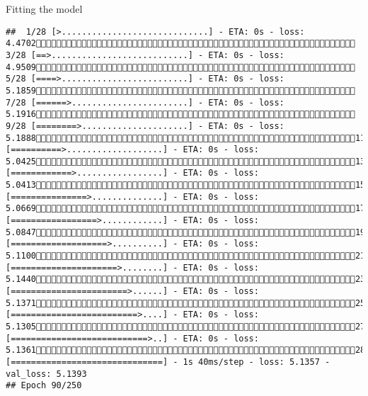 \documentclass[
  ignorenonframetext,
]{beamer}
\begin{document}
\begin{frame}[fragile]{Fitting the model}
\begin{verbatim}
##  1/28 [>.............................] - ETA: 0s - loss: 4.4702 3/28 [==>...........................] - ETA: 0s - loss: 4.9509 5/28 [====>.........................] - ETA: 0s - loss: 5.1859 7/28 [======>.......................] - ETA: 0s - loss: 5.1916 9/28 [========>.....................] - ETA: 0s - loss: 5.188811/28 [==========>...................] - ETA: 0s - loss: 5.042513/28 [============>.................] - ETA: 0s - loss: 5.041315/28 [===============>..............] - ETA: 0s - loss: 5.066917/28 [=================>............] - ETA: 0s - loss: 5.084719/28 [===================>..........] - ETA: 0s - loss: 5.110021/28 [=====================>........] - ETA: 0s - loss: 5.144023/28 [=======================>......] - ETA: 0s - loss: 5.137125/28 [=========================>....] - ETA: 0s - loss: 5.130527/28 [===========================>..] - ETA: 0s - loss: 5.136128/28 [==============================] - 1s 40ms/step - loss: 5.1357 - val_loss: 5.1393
## Epoch 90/250

\end{verbatim}
\end{frame}
\end{document}

